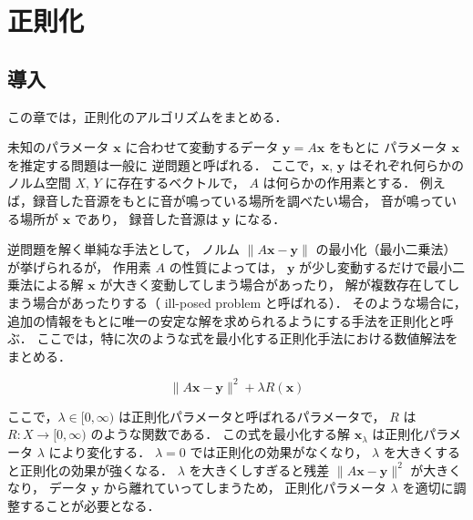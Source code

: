 %

\part{正則化}\label{part:regularization}

\chapter{導入}

この章では，正則化のアルゴリズムをまとめる．

未知のパラメータ $\bm{x}$ に合わせて変動するデータ $\bm{y} = A \bm{x}$ をもとに
パラメータ $\bm{x}$ を推定する問題は一般に  逆問題と呼ばれる．
ここで，$\bm{x}$, $\bm{y}$ はそれぞれ何らかのノルム空間 $X$, $Y$ に存在するベクトルで，
$A$ は何らかの作用素とする．
例えば，録音した音源をもとに音が鳴っている場所を調べたい場合，
音が鳴っている場所が $\bm{x}$ であり，
録音した音源は $\bm{y}$ になる．

逆問題を解く単純な手法として，
ノルム $\|A \bm{x} - \bm{y}\|$ の最小化（最小二乗法）が挙げられるが，
作用素 $A$ の性質によっては，
$\bm{y}$ が少し変動するだけで最小二乗法による解 $\bm{x}$ が大きく変動してしまう場合があったり，
解が複数存在してしまう場合があったりする（ ill-posed problem と呼ばれる）．
そのような場合に，追加の情報をもとに唯一の安定な解を求められるようにする手法を正則化と呼ぶ．
ここでは，特に次のような式を最小化する正則化手法における数値解法をまとめる．

\begin{equation}
    \|A \bm{x} - \bm{y}\|^2 + \lambda R(\bm{x})
    \label{eq:regularization_intro_general-regularization}
\end{equation}

ここで，$\lambda \in [0, \infty)$ は正則化パラメータと呼ばれるパラメータで，
$R$ は $R : X \to [0, \infty)$ のような関数である．
この式を最小化する解 $\bm{x}_{\lambda}$ は正則化パラメータ $\lambda$ により変化する．
$\lambda = 0$ では正則化の効果がなくなり，
$\lambda$ を大きくすると正則化の効果が強くなる．
$\lambda$ を大きくしすぎると残差 $\|A \bm{x} - \bm{y}\|^2$ が大きくなり，
データ $\bm{y}$ から離れていってしまうため，
正則化パラメータ $\lambda$ を適切に調整することが必要となる．





